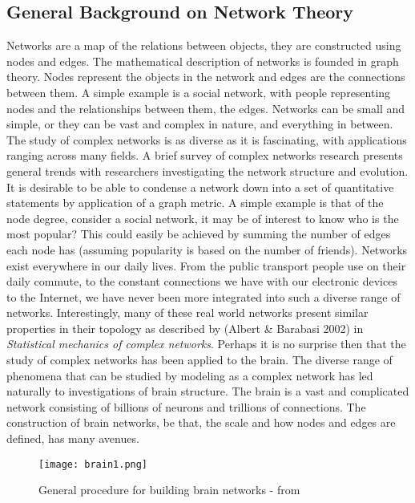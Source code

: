 \documentclass[11pt]{article}
\begin{document}
\subsection{General Background on Network Theory}
Networks are a map of the relations between objects, they are constructed using nodes and edges. The mathematical description of networks is founded in graph theory. Nodes represent the objects in the network and edges are the connections between them. A simple example is a social network, with people representing nodes and the relationships between them, the edges. Networks can be small and simple, or they can be vast and complex in nature, and everything in between. The study of complex networks is as diverse as it is fascinating, with applications ranging across many fields. A brief survey of complex networks research presents general trends with researchers investigating the network structure and evolution. It is desirable to be able to condense a network down into a set of quantitative statements by application of a graph metric. A simple example is that of the node degree, consider a social network, it may be of interest to know who is the most popular? This could easily be achieved by summing the number of edges each node has (assuming popularity is based on the number of friends). Networks exist everywhere in our daily lives. From the public transport people use on their daily commute, to the constant connections we have with our electronic devices to the Internet, we have never been more integrated into such a diverse range of networks. Interestingly, many of these real world networks present similar properties in their topology as described by (Albert \& Barabasi 2002) in \emph{Statistical mechanics of complex networks}. Perhaps it is no surprise then that the study of complex networks has been applied to the brain. The diverse range of phenomena that can be studied by modeling as a complex network has led naturally to investigations of brain structure. The brain is a vast and complicated network consisting of billions of neurons and trillions of connections. The construction of brain networks, be that, the scale and how nodes and edges are defined, has many avenues.
\begin{figure}[h!]%
\centering\texttt{[image: brain1.png]}%
\caption{General procedure for building brain networks -  from \citep{fall}}
\label{b1}
\end{figure}
\end{document}
